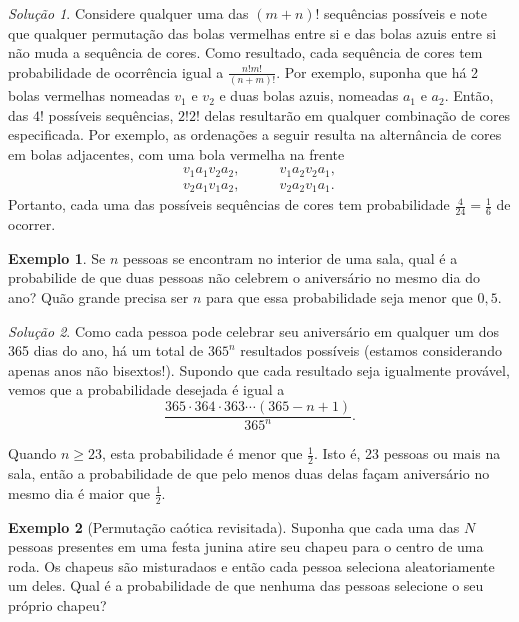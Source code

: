 \documentclass[]{book}
\theoremstyle{definition}
\theoremstyle{definition}
\newtheorem{example}{Exemplo}[chapter]
\theoremstyle{definition}
\theoremstyle{remark}
\newtheorem*{solution}{Solução}
\begin{document}
\begin{solution}
\iffalse{} {Solução. } \fi{}Considere qualquer uma das \((m+n)!\) sequências possíveis e note que qualquer permutação das bolas vermelhas entre si e das bolas azuis entre si não muda a sequência de cores.
Como resultado, cada sequência de cores tem probabilidade de ocorrência igual a \(\frac{n!m!}{(n+m)!}.\)
Por exemplo, suponha que há 2 bolas vermelhas nomeadas \(v_1\) e \(v_2\) e duas bolas azuis, nomeadas \(a_1\) e \(a_2\).
Então, das \(4!\) possíveis sequências, \(2!2!\) delas resultarão em qualquer combinação de cores especificada.
Por exemplo, as ordenações a seguir resulta na alternância de cores em bolas adjacentes, com uma bola vermelha na frente
\begin{align}
v_1 a_1 v_2 a_2, & \qquad v_1 a_2 v_2 a_1, \\
v_2 a_1 v_1 a_2, & \qquad v_2 a_2 v_1 a_1.
\end{align}
Portanto, cada uma das possíveis sequências de cores tem probabilidade \(\frac{4}{24}=\frac{1}{6}\) de ocorrer.
\end{solution}

\begin{example}
\protect\hypertarget{exm:unnamed-chunk-139}{}{\label{exm:unnamed-chunk-139} }Se \(n\) pessoas se encontram no interior de uma sala, qual é a probabilide de que duas pessoas não celebrem o aniversário no mesmo dia do ano?
Quão grande precisa ser \(n\) para que essa probabilidade seja menor que \(0{,}5\).
\end{example}

\begin{solution}
\iffalse{} {Solução. } \fi{}Como cada pessoa pode celebrar seu aniversário em qualquer um dos 365 dias do ano, há um total de \(365^n\) resultados possíveis (estamos considerando apenas anos não bisextos!).
Supondo que cada resultado seja igualmente provável, vemos que a probabilidade desejada é igual a
\[\frac{365\cdot 364\cdot 363 \cdots (365-n+1)}{365^n}.\]

Quando \(n\geq 23\), esta probabilidade é menor que \(\frac{1}{2}\).
Isto é, 23 pessoas ou mais na sala, então a probabilidade de que pelo menos duas delas façam aniversário no mesmo dia é maior que \(\frac{1}{2}\).
\end{solution}

\begin{example}[Permutação caótica revisitada]
\protect\hypertarget{exm:unnamed-chunk-141}{}{\label{exm:unnamed-chunk-141} \iffalse (Permutação caótica revisitada) \fi{} }Suponha que cada uma das \(N\) pessoas presentes em uma festa junina atire seu chapeu para o centro de uma roda.
Os chapeus são misturadaos e então cada pessoa seleciona aleatoriamente um deles.
Qual é a probabilidade de que nenhuma das pessoas selecione o seu próprio chapeu?
\end{example}
\end{document}
